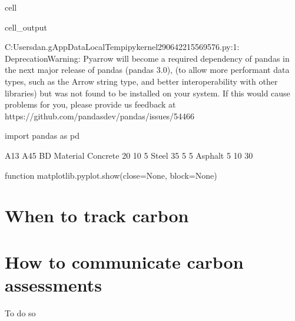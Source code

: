 \documentclass[letterpaper,10pt,english]{jupyterBook}
\begin{document}
\begin{sphinxuseclass}{cell}
\begin{sphinxVerbatimOutput}
\begin{sphinxuseclass}{cell_output}
\begin{sphinxVerbatim}[commandchars=\\\{\}]
C:\PYGZbs{}Users\PYGZbs{}dan.g\PYGZbs{}AppData\PYGZbs{}Local\PYGZbs{}Temp\PYGZbs{}ipykernel\PYGZus{}29064\PYGZbs{}2215569576.py:1: DeprecationWarning: 
Pyarrow will become a required dependency of pandas in the next major release of pandas (pandas 3.0),
(to allow more performant data types, such as the Arrow string type, and better interoperability with other libraries)
but was not found to be installed on your system.
If this would cause problems for you,
please provide us feedback at https://github.com/pandas\PYGZhy{}dev/pandas/issues/54466
        
  import pandas as pd
\end{sphinxVerbatim}

\begin{sphinxVerbatim}[commandchars=\\\{\}]
          A1\PYGZhy{}3  A4\PYGZhy{}5  B\PYGZhy{}D
Material                 
Concrete    20    10    5
Steel       35     5    5
Asphalt      5    10   30
\end{sphinxVerbatim}

\begin{sphinxVerbatim}[commandchars=\\\{\}]
\PYGZlt{}function matplotlib.pyplot.show(close=None, block=None)\PYGZgt{}
\end{sphinxVerbatim}

\noindent{}

\end{sphinxuseclass}\end{sphinxVerbatimOutput}

\end{sphinxuseclass}

\section{When to track carbon}
\label{\detokenize{part1/keeping_track:when-to-track-carbon}}

\section{How to communicate carbon assessments}
\label{\detokenize{part1/keeping_track:how-to-communicate-carbon-assessments}}
\sphinxAtStartPar
To do so
\end{document}
